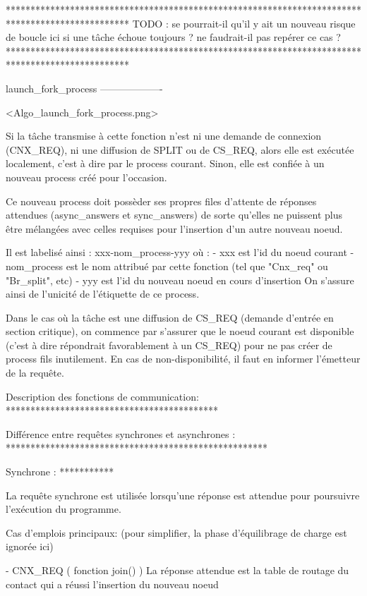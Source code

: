 *************************************************************************************************
TODO : se pourrait-il qu'il y ait un nouveau risque de boucle ici si une tâche échoue toujours ?
       ne faudrait-il pas repérer ce cas ?
*************************************************************************************************


launch_fork_process
-------------------

<Algo_launch_fork_process.png>

Si la tâche transmise à cette fonction n'est ni une demande de connexion (CNX_REQ), ni une
diffusion de SPLIT ou de CS_REQ, alors elle est exécutée localement, c'est à dire par le process
courant. Sinon, elle est confiée à un nouveau process créé pour l'occasion.

Ce nouveau process doit possèder ses propres files d'attente de réponses attendues (async_answers et
sync_answers) de sorte qu'elles ne puissent plus être mélangées avec celles requises pour l'insertion
d'un autre nouveau noeud.

Il est labelisé ainsi : xxx-nom_process-yyy où :
  - xxx est l'id du noeud courant
  - nom_process est le nom attribué par cette fonction (tel que "Cnx_req" ou "Br_split", etc)
  - yyy est l'id du nouveau noeud en cours d'insertion
On s'assure ainsi de l'unicité de l'étiquette de ce process.

Dans le cas où la tâche est une diffusion de CS_REQ (demande d'entrée en section critique), on
commence par s'assurer que le noeud courant est disponible (c'est à dire répondrait favorablement à
un CS_REQ) pour ne pas créer de process fils inutilement. En cas de non-disponibilité, il faut en
informer l'émetteur de la requête.

Description des fonctions de communication:
*******************************************

Différence entre requêtes synchrones et asynchrones :
*****************************************************

Synchrone :
***********

La requête synchrone est utilisée lorsqu'une réponse est attendue pour poursuivre l'exécution du
programme.

Cas d'emplois principaux:
(pour simplifier, la phase d'équilibrage de charge est ignorée ici)

- CNX_REQ ( fonction join() )
  La réponse attendue est la table de routage du contact qui a réussi l'insertion du nouveau noeud

